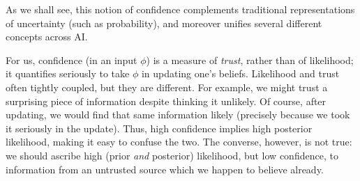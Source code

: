 As we shall see, this notion of confidence
complements traditional representations of uncertainty (such as probability), 
and moreover unifies several different concepts
across AI.


For us, confidence (in an input $\phi$) is a measure of \emph{trust}, rather than of likelihood; it quantifies seriously to take $\phi$ in updating one's beliefs.
Likelihood and trust often tightly coupled, but they are different.
For example, we might trust a surprising piece of information despite thinking it unlikely.
%
Of course, after updating, we would find that same information likely (precisely because we took it seriously in the update).
%
Thus, high confidence implies high posterior likelihood, making it easy to confuse the two.
The converse, however, is not true:
we should ascribe high (prior \emph{and} posterior) likelihood, but low confidence, to information from an untrusted source which we happen to believe already.

